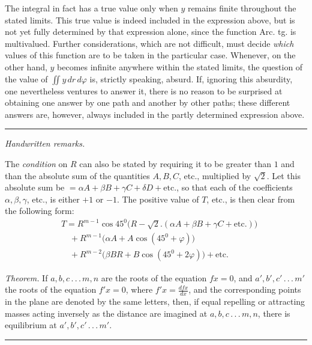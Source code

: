 The integral in fact has a true value only when $y$ remains finite throughout the stated limits. This true value is indeed included in the expression above, but is not yet fully determined by that expression alone, since the function Arc. tg. is multivalued. Further considerations, which are not difficult, must decide \emph{which}
values of this function are to be taken in the particular case. Whenever, on the other hand, $y$ becomes infinite anywhere within the stated limits, the question of the value of $\iint y\,dr\,d\varphi$ is, strictly speaking, absurd. If, ignoring this absurdity, one nevertheless ventures to answer it, there is no reason to be surprised at obtaining one answer by one path and another by other paths; these different answers are, however, always included in the partly determined expression above.

\par\medskip\noindent\rule{0.25\linewidth}{0.4pt}\par\smallskip
\begingroup\small
\emph{Handwritten remarks.}

The \emph{condition} on $R$ can also be stated by requiring it to be greater than $1$ and than the absolute sum of the quantities $A,B,C$, etc., multiplied by $\surd2$. Let this absolute sum be $=\alpha A+\beta B+\gamma C+\delta D+\mathrm{etc.}$, so that each of the coefficients $\alpha,\beta,\gamma$, etc., is either $+1$ or $-1$. The positive value of $T$, etc., is then clear from the following form:
\[
\begin{aligned}&T=R^{m-1}\cos45^0\bigl(R-\surd2.(\alpha A+\beta B+\gamma C+\mathrm{etc.})\bigr)\\
&\quad+R^{m-1}\bigl(\alpha A+A\cos(45^0+\varphi)\bigr)\\
&\quad+R^{m-2}\bigl(\beta BR+B\cos(45^0+2\varphi)\bigr)+\mathrm{etc.}
\end{aligned}
\]

\emph{Theorem.} If $a,b,c\,.\,.\,.\,m,n$ are the roots of the equation $fx=0$, and $a',b',c'\,.\,.\,.\,m'$ the roots of the equation $f'x=0$, where $f'x=\frac{dfx}{dx}$, and the corresponding points in the plane are denoted by the same letters, then, if equal repelling or attracting masses acting inversely as the distance are imagined at $a,b,c\,.\,.\,.\,m,n$, there is equilibrium at $a',b',c'\,.\,.\,.\,m'$.
\endgroup

\par\medskip\begin{center}\rule{0.25\linewidth}{0.4pt}\end{center}

